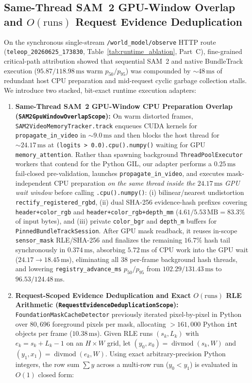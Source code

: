 \documentclass[10pt,journal]{IEEEtran}
\begin{document}
\subsection{Same-Thread SAM~2 GPU-Window Overlap and $O(\text{runs})$ Request Evidence Deduplication}
\label{sec:gpu_window_and_dedup}
On the synchronous single-stream \texttt{/world\_model/observe} HTTP route (\texttt{teleop\_20260625\_173830}, Table~\ref{tab:runtime_ablation}, Part~C), fine-grained critical-path attribution showed that sequential SAM~2 and native BundleTrack execution ($95.87 / 118.98\,\mathrm{ms}$ warm $p_{50}/p_{95}$) was compounded by $\sim 48\,\mathrm{ms}$ of redundant host CPU preparation and mid-request cyclic garbage collection stalls. We introduce two stacked, bit-exact runtime execution adapters:
\begin{enumerate}
    \item \textbf{Same-Thread SAM~2 GPU-Window CPU Preparation Overlap (\texttt{SAM2GpuWindowOverlapScope}):} On warm distorted frames, \texttt{SAM2VideoMemoryTracker.track} enqueues CUDA kernels for \texttt{propagate\_in\_video} in $\sim 9.0\,\mathrm{ms}$ and then blocks the host thread for $\sim 24.17\,\mathrm{ms}$ at \texttt{(logits > 0.0).cpu().numpy()} waiting for GPU \texttt{memory\_attention}. Rather than spawning background \texttt{ThreadPoolExecutor} workers that contend for the Python GIL, our adapter performs a $0.25\,\mathrm{ms}$ fail-closed pre-validation, launches \texttt{propagate\_in\_video}, and executes mask-independent CPU preparation \emph{on the same thread inside the $24.17\,\mathrm{ms}$ GPU wait window} before calling \texttt{.cpu().numpy()}: (i) bilinear/nearest undistortion \texttt{rectify\_registered\_rgbd}, (ii) dual SHA-256 evidence-hash prefixes covering \texttt{header+color\_rgb} and \texttt{header+color\_rgb+depth\_mm} ($4.61 / 5.53\,\mathrm{MB} = 83.3\%$ of input bytes), and (iii) private \texttt{color\_bgr} and \texttt{depth\_m} buffers for \texttt{PinnedBundleTrackSession}. After GPU mask readback, it reuses in-scope \texttt{sensor\_mask} RLE/SHA-256 and finalizes the remaining $16.7\%$ hash tail synchronously in $0.374\,\mathrm{ms}$, absorbing $5.72\,\mathrm{ms}$ of CPU work into the GPU wait ($24.17 \to 18.45\,\mathrm{ms}$), eliminating all $38$ per-frame background hash threads, and lowering \texttt{registry\_advance\_ms} $p_{50}/p_{95}$ from $102.29/131.43\,\mathrm{ms}$ to $96.53/124.48\,\mathrm{ms}$.
    \item \textbf{Request-Scoped Evidence Deduplication and Exact $O(\text{runs})$ RLE Arithmetic (\texttt{RequestEvidenceDeduplicationScope}):} \texttt{FoundationMaskCacheDetector} previously iterated pixel-by-pixel in Python over $80{,}696$ foreground pixels per mask, allocating $>161{,}000$ Python \texttt{int} objects per frame ($10.38\,\mathrm{ms}$). Given RLE runs $(s_k, L_k)$ with $e_k = s_k + L_k - 1$ on an $H\times W$ grid, let $(y_0, x_0) = \operatorname{divmod}(s_k, W)$ and $(y_1, x_1) = \operatorname{divmod}(e_k, W)$. Using exact arbitrary-precision Python integers, the row sum $\sum y$ across a multi-row run ($y_0 < y_1$) is evaluated in $O(1)$ closed form:

\end{enumerate}
\end{document}
